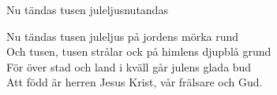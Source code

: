 \begin{song}{Nu tändas tusen juleljus}{nutandas}
\begin{vers}
Nu tändas tusen juleljus på jordens mörka rund\\
Och tusen, tusen strålar ock på himlens djupblå grund\\
För över stad och land i kväll går julens glada bud\\
Att född är herren Jesus Krist, vår frälsare och Gud.
\end{vers}
\end{song}
